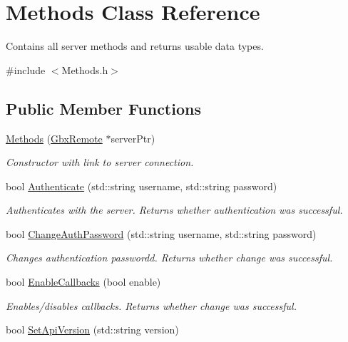 \hypertarget{classMethods}{\section{Methods Class Reference}
\label{classMethods}
}


Contains all server methods and returns usable data types.  




{\ttfamily \#include $<$Methods.\-h$>$}

\subsection*{Public Member Functions}
\begin{DoxyCompactItemize}
\item 
\hyperlink{classMethods_a1f18bb4a4d06ccec83f36fa32545015d}{Methods} (\hyperlink{classGbxRemote}{Gbx\-Remote} $\ast$server\-Ptr)
\begin{DoxyCompactList}\small\item\em Constructor with link to server connection. \end{DoxyCompactList}\item 
bool \hyperlink{classMethods_aa1bba4d023f013fedf3edff7c69f5d08}{Authenticate} (std\-::string username, std\-::string password)
\begin{DoxyCompactList}\small\item\em Authenticates with the server. Returns whether authentication was successful. \end{DoxyCompactList}\item 
bool \hyperlink{classMethods_a6bef98053e6d6d4f80557be7ce841e80}{Change\-Auth\-Password} (std\-::string username, std\-::string password)
\begin{DoxyCompactList}\small\item\em Changes authentication passwordd. Returns whether change was successful. \end{DoxyCompactList}\item 
bool \hyperlink{classMethods_a9f47416487f6a825133c2d1e01287956}{Enable\-Callbacks} (bool enable)
\begin{DoxyCompactList}\small\item\em Enables/disables callbacks. Returns whether change was successful. \end{DoxyCompactList}\item 
bool \hyperlink{classMethods_ad31d717a19f95d4213d6882a0caff0fa}{Set\-Api\-Version} (std\-::string version)

\end{DoxyCompactItemize}
